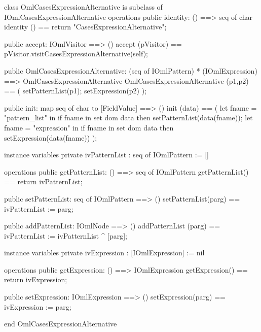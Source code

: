 \begin{vdm_al}
class OmlCasesExpressionAlternative is subclass of IOmlCasesExpressionAlternative
operations
  public identity: () ==> seq of char
  identity () == return "CasesExpressionAlternative";

  public accept: IOmlVisitor ==> ()
  accept (pVisitor) == pVisitor.visitCasesExpressionAlternative(self);

  public OmlCasesExpressionAlternative:
      (seq of IOmlPattern) *
      (IOmlExpression) ==> OmlCasesExpressionAlternative
  OmlCasesExpressionAlternative (p1,p2) == 
   ( setPatternList(p1);
     setExpression(p2) );

  public init: map seq of char to [FieldValue] ==> ()
  init (data) ==
    ( let fname = "pattern_list" in
        if fname in set dom data
        then setPatternList(data(fname));
      let fname = "expression" in
        if fname in set dom data
        then setExpression(data(fname)) );

instance variables
  private ivPatternList : seq of IOmlPattern := []

operations
  public getPatternList: () ==> seq of IOmlPattern
  getPatternList() == return ivPatternList;

  public setPatternList: seq of IOmlPattern ==> ()
  setPatternList(parg) == ivPatternList := parg;

  public addPatternList: IOmlNode ==> ()
  addPatternList (parg) == ivPatternList := ivPatternList ^ [parg];

instance variables
  private ivExpression : [IOmlExpression] := nil

operations
  public getExpression: () ==> IOmlExpression
  getExpression() == return ivExpression;

  public setExpression: IOmlExpression ==> ()
  setExpression(parg) == ivExpression := parg;

end OmlCasesExpressionAlternative
\end{vdm_al}

